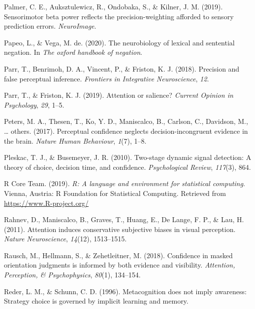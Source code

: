\documentclass[12pt,twoside]{reedthesis}
\newenvironment{CSLReferences}%
  {}%
  {\par}
\begin{document}
\begin{CSLReferences}{1}{0}
\leavevmode\hypertarget{ref-palmer2019sensorimotor}{}%
Palmer, C. E., Auksztulewicz, R., Ondobaka, S., \& Kilner, J. M. (2019). Sensorimotor beta power reflects the precision-weighting afforded to sensory prediction errors. \emph{NeuroImage}.

\leavevmode\hypertarget{ref-papeo2020neurobiology}{}%
Papeo, L., \& Vega, M. de. (2020). The neurobiology of lexical and sentential negation. In \emph{The oxford handbook of negation}.

\leavevmode\hypertarget{ref-parr2018precision}{}%
Parr, T., Benrimoh, D. A., Vincent, P., \& Friston, K. J. (2018). Precision and false perceptual inference. \emph{Frontiers in Integrative Neuroscience}, \emph{12}.

\leavevmode\hypertarget{ref-parr2019attention}{}%
Parr, T., \& Friston, K. J. (2019). Attention or salience? \emph{Current Opinion in Psychology}, \emph{29}, 1--5.

\leavevmode\hypertarget{ref-peters2017perceptual}{}%
Peters, M. A., Thesen, T., Ko, Y. D., Maniscalco, B., Carlson, C., Davidson, M., \ldots{} others. (2017). Perceptual confidence neglects decision-incongruent evidence in the brain. \emph{Nature Human Behaviour}, \emph{1}(7), 1--8.

\leavevmode\hypertarget{ref-pleskac2010two}{}%
Pleskac, T. J., \& Busemeyer, J. R. (2010). Two-stage dynamic signal detection: A theory of choice, decision time, and confidence. \emph{Psychological Review}, \emph{117}(3), 864.

\leavevmode\hypertarget{ref-R-base}{}%
R Core Team. (2019). \emph{R: A language and environment for statistical computing}. Vienna, Austria: R Foundation for Statistical Computing. Retrieved from \url{https://www.R-project.org/}

\leavevmode\hypertarget{ref-rahnev2011attention}{}%
Rahnev, D., Maniscalco, B., Graves, T., Huang, E., De Lange, F. P., \& Lau, H. (2011). Attention induces conservative subjective biases in visual perception. \emph{Nature Neuroscience}, \emph{14}(12), 1513--1515.

\leavevmode\hypertarget{ref-rausch2018confidence}{}%
Rausch, M., Hellmann, S., \& Zehetleitner, M. (2018). Confidence in masked orientation judgments is informed by both evidence and visibility. \emph{Attention, Perception, \& Psychophysics}, \emph{80}(1), 134--154.

\leavevmode\hypertarget{ref-reder1996metacognition}{}%
Reder, L. M., \& Schunn, C. D. (1996). Metacognition does not imply awareness: Strategy choice is governed by implicit learning and memory.


\end{CSLReferences}
\end{document}
